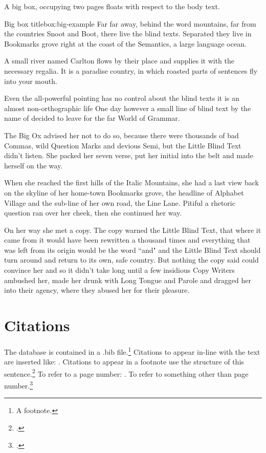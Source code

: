 \documentclass{grattan}
\begin{document}
A big box, occupying two pages floats with respect to the body text.

\begin{bigbox*}{Big box title}{box:big-example}
Far far away, behind the word mountains, far from the countries Snoot and Boot, there live the blind texts.
Separated they live in Bookmarks grove right at the coast of the Semantics, a large language ocean.

A small river named Carlton flows by their place and supplies it with the necessary regalia.
It is a paradise country, in which roasted parts of sentences fly into your mouth.

Even the all-powerful pointing has no control about the blind texts it is an almost non-orthographic life One day however a small line of blind text by the name of  decided to leave for the far World of Grammar.

The Big Ox advised her not to do so, because there were thousands of bad Commas, wild Question Marks and devious Semi, but the Little Blind Text didn't listen.
She packed her seven verse, put her initial into the belt and made herself on the way.

When she reached the first hills of the Italic Mountains, she had a last view back on the skyline of her home-town Bookmarks grove, the headline of Alphabet Village and the sub-line of her own road, the Line Lane.
Pitiful a rhetoric question ran over her cheek, then she continued her way.

On her way she met a copy.
The copy warned the Little Blind Text, that where it came from it would have been rewritten a thousand times and everything that was left from its origin would be the word ``and" and the Little Blind Text should turn around and return to its own, safe country.
But nothing the copy said could convince her and so it didn't take long until a few insidious Copy Writers ambushed her, made her drunk with Long Tongue and Parole and dragged her into their agency, where they abused her for their pleasure.
\end{bigbox*}

\chapter{Citations}\label{chap:citations}
The database is contained in a .bib file.\footnote{A footnote.} 
Citations to appear in-line with the text are inserted like: \textcite{Daley-etal-2016-SAPTO}.
Citations to appear in a footnote use the structure of this sentence.\footcite{Daley-etal-2016-Assessing-2016-super-tax-reforms}
To refer to a page number: \textcite[][30]{Daley-etal-2016-SAPTO}.
To refer to something other than page number.\footcite[][Chapter~4]{Daley-etal-2016-SAPTO}
\end{document}
